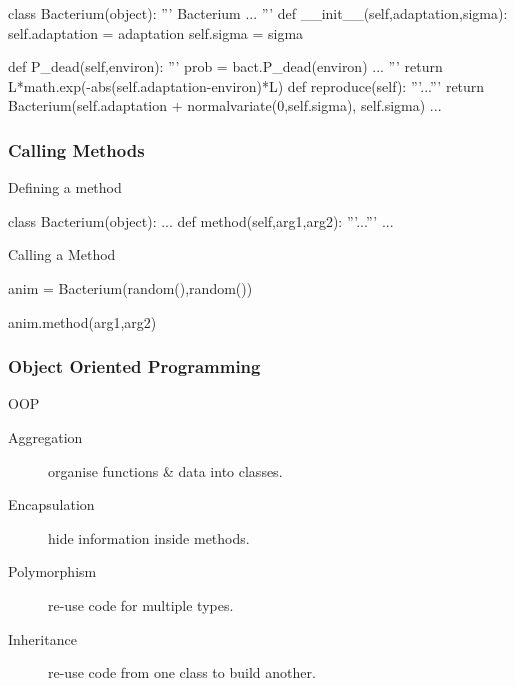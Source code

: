 \begin{frame}[fragile]
\begin{python}
class Bacterium(object):
    '''
    Bacterium
    ...
    '''
    def __init__(self,adaptation,sigma):
        self.adaptation = adaptation
        self.sigma = sigma
    
    def P_dead(self,environ):
        '''
        prob = bact.P_dead(environ)
        ...
        '''
        return L*math.exp(-abs(self.adaptation-environ)*L)
    def reproduce(self):
        '''...'''
        return Bacterium(self.adaptation +
                             normalvariate(0,self.sigma),
                             self.sigma)
    ...
\end{python}
\end{frame}

\begin{frame}[fragile]
\frametitle{Calling Methods}

\begin{block}{Defining a method}
\begin{python}
class Bacterium(object):
    ...
    def method(self,arg1,arg2):
        '''...'''
        ...
\end{python}
\end{block}

\begin{block}{Calling a Method}
\begin{python}
anim = Bacterium(random(),random())

anim.method(arg1,arg2)
\end{python}
\end{block}
\end{frame}

\begin{frame}[fragile] 
\frametitle{Object Oriented Programming}

\begin{block}{OOP}
\begin{description}
\item[\alert{Aggregation}] organise functions \& data into classes.
\item[\alert{Encapsulation}] hide information inside methods.
\item[Polymorphism] re-use code for multiple types.
\item[Inheritance] re-use code from one class to build another.
\end{description}
\end{block}
\end{frame}


